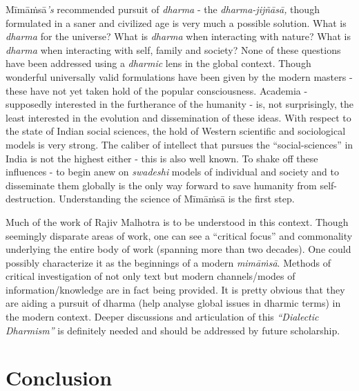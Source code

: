 Mīmāṁsā\textit{’s} recommended pursuit of \textit{dharma} - the \textit{dharma-jijñāsā,} though formulated in a saner and civilized age is very much a possible solution. What is \textit{dharma} for the universe? What is \textit{dharma} when interacting with nature? What is \textit{dharma} when interacting with self, family and society? None of these questions have been addressed using a \textit{dharmic} lens in the global context. Though wonderful universally valid formulations have been given by the modern masters - these have not yet taken hold of the popular consciousness. Academia - supposedly interested in the furtherance of the humanity - is, not surprisingly, the least interested in the evolution and dissemination of these ideas. With respect to the state of Indian social sciences, the hold of Western scientific and sociological models is very strong. The caliber of intellect that pursues the “social-sciences” in India is not the highest either - this is also well known. To shake off these influences - to begin anew on \textit{swadeshi} models of individual and society and to disseminate them globally is the only way forward to save humanity from self-destruction. Understanding the science of Mīmāṁsā is the first step.

Much of the work of Rajiv Malhotra is to be understood in this context. Though seemingly disparate areas of work, one can see a “critical focus” and commonality underlying the entire body of work (spanning more than two decades). One could possibly characterize it as the beginnings of a modern \textit{mimāṁsā}. Methods of critical investigation of not only text but modern channels/modes of information/knowledge are in fact being provided. It is pretty obvious that they are aiding a pursuit of dharma (help analyse global issues in dharmic terms) in the modern context. Deeper discussions and articulation of this \textit{“Dialectic Dharmism”} is definitely needed and should be addressed by future scholarship.

\section*{Conclusion}

